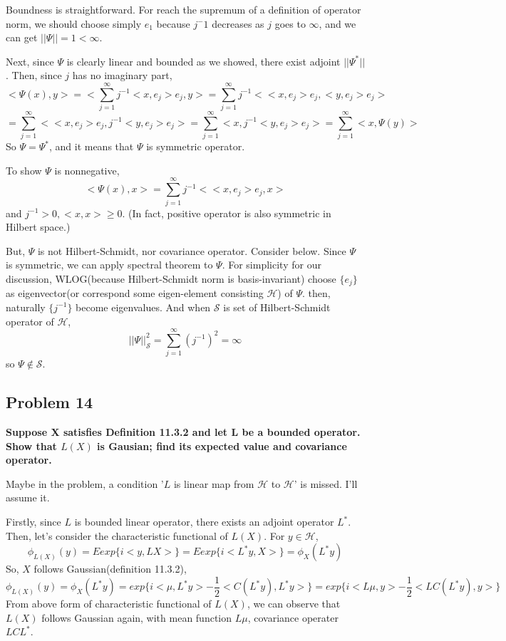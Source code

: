 \documentclass{article}
\begin{document}
Boundness is straightforward. For reach the supremum of a definition of operator norm,
we should choose simply $e_1$ because $j^-1$ decreases as $j$ goes to $\infty$,
and we can get $||\Psi||=1<\infty$.

Next, since $\Psi$ is clearly linear and bounded as we showed, there exist adjoint $||\Psi^*||$.
Then, since $j$ has no imaginary part,
\[<\Psi(x),y>=<\sum_{j=1}^{\infty}j^{-1}<x,e_j>e_j,y>
=\sum_{j=1}^{\infty}j^{-1}<<x,e_j>e_j,<y,e_j>e_j>\]
\[=\sum_{j=1}^{\infty}<<x,e_j>e_j,j^{-1}<y,e_j>e_j>
=\sum_{j=1}^{\infty}<x,j^{-1}<y,e_j>e_j>
=\sum_{j=1}^{\infty}<x,\Psi(y)>\]
So $\Psi=\Psi^*$, and it means that $\Psi$ is symmetric operator.

To show $\Psi$ is nonnegative,
\[<\Psi(x),x>=\sum_{j=1}^{\infty}j^{-1}<<x,e_j>e_j,x>\]
and $j^{-1}>0, <x,x>\geq0$. (In fact, positive operator is also symmetric in Hilbert space.)

But, $\Psi$ is not Hilbert-Schmidt, nor covariance operator. Consider below.
Since $\Psi$ is symmetric, we can apply spectral theorem to $\Psi$.
For simplicity for our discussion, WLOG(because Hilbert-Schmidt norm is basis-invariant) 
choose $\{e_j\}$ as eigenvector(or correspond some eigen-element consisting $\mathcal{H}$) of $\Psi$.
then, naturally $\{j^{-1}\}$ become eigenvalues. And when $\mathcal{S}$ is set of Hilbert-Schmidt operator of $\mathcal{H}$,
\[||\Psi||_{\mathcal{S}}^{2}=\sum_{j=1}^{\infty}(j^{-1})^2=\infty\]
so $\Psi\notin\mathcal{S}$.



\subsection{Problem 14}
\textbf{
    Suppose X satisfies Definition 11.3.2 and let L be a bounded operator. 
    Show that $L(X)$ is Gausian; find its expected value and covariance operator.
}

Maybe in the problem, a condition '$L$ is linear map from $\mathcal{H}$ to $\mathcal{H}$' is missed. I'll assume it.

Firstly, since $L$ is bounded linear operator, there exists an adjoint operator $L^*$.
Then, let's consider the characteristic functional of $L(X)$. 
For $y\in\mathcal{H}$,
\[\phi_{L(X)}(y)=Eexp\{i<y,LX>\}=Eexp\{i<L^*y,X>\}=\phi_X(L^*y)\]
So, $X$ follows Gaussian(definition 11.3.2),
\[\phi_{L(X)}(y)=\phi_X(L^*y)=exp\{i<\mu,L^*y>-\frac{1}{2}<C(L^*y),L^*y>\}
=exp\{i<L\mu,y>-\frac{1}{2}<LC(L^*y),y>\}\]
From above form of characteristic functional of $L(X)$, we can observe that $L(X)$ follows Gaussian again, with
mean function $L\mu$, covariance operater $LCL^*$.
\end{document}
